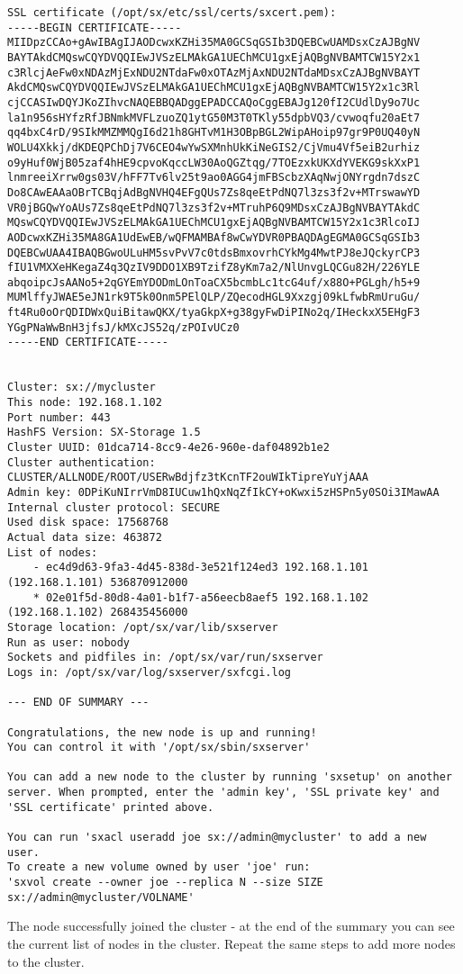 \begin{lstlisting}
SSL certificate (/opt/sx/etc/ssl/certs/sxcert.pem):
-----BEGIN CERTIFICATE-----
MIIDpzCCAo+gAwIBAgIJAODcwxKZHi35MA0GCSqGSIb3DQEBCwUAMDsxCzAJBgNV
BAYTAkdCMQswCQYDVQQIEwJVSzELMAkGA1UEChMCU1gxEjAQBgNVBAMTCW15Y2x1
c3RlcjAeFw0xNDAzMjExNDU2NTdaFw0xOTAzMjAxNDU2NTdaMDsxCzAJBgNVBAYT
AkdCMQswCQYDVQQIEwJVSzELMAkGA1UEChMCU1gxEjAQBgNVBAMTCW15Y2x1c3Rl
cjCCASIwDQYJKoZIhvcNAQEBBQADggEPADCCAQoCggEBAJg120fI2CUdlDy9o7Uc
la1n956sHYfzRfJBNmkMVFLzuoZQ1ytG50M3T0TKly55dpbVQ3/cvwoqfu20aEt7
qq4bxC4rD/9SIkMMZMMQgI6d21h8GHTvM1H3OBpBGL2WipAHoip97gr9P0UQ40yN
WOLU4Xkkj/dKDEQPChDj7V6CEO4wYwSXMnhUkKiNeGIS2/CjVmu4Vf5eiB2urhiz
o9yHuf0WjB05zaf4hHE9cpvoKqccLW30AoQGZtqg/7TOEzxkUKXdYVEKG9skXxP1
lnmreeiXrrw0gs03V/hFF7Tv6lv25t9ao0AGG4jmFBScbzXAqNwjONYrgdn7dszC
Do8CAwEAAaOBrTCBqjAdBgNVHQ4EFgQUs7Zs8qeEtPdNQ7l3zs3f2v+MTrswawYD
VR0jBGQwYoAUs7Zs8qeEtPdNQ7l3zs3f2v+MTruhP6Q9MDsxCzAJBgNVBAYTAkdC
MQswCQYDVQQIEwJVSzELMAkGA1UEChMCU1gxEjAQBgNVBAMTCW15Y2x1c3RlcoIJ
AODcwxKZHi35MA8GA1UdEwEB/wQFMAMBAf8wCwYDVR0PBAQDAgEGMA0GCSqGSIb3
DQEBCwUAA4IBAQBGwoULuHM5svPvV7c0tdsBmxovrhCYkMg4MwtPJ8eJQckyrCP3
fIU1VMXXeHKegaZ4q3QzIV9DDO1XB9TzifZ8yKm7a2/NlUnvgLQCGu82H/226YLE
abqoipcJsAANo5+2qGYEmYDODmLOnToaCX5bcmbLc1tcG4uf/x88O+PGLgh/h5+9
MUMlffyJWAE5eJN1rk9T5k0Onm5PElQLP/ZQecodHGL9Xxzgj09kLfwbRmUruGu/
ft4Ru0oOrQDIDWxQuiBitawQKX/tyaGkpX+g38gyFwDiPINo2q/IHeckxX5EHgF3
YGgPNaWwBnH3jfsJ/kMXcJS52q/zPOIvUCz0
-----END CERTIFICATE-----


Cluster: sx://mycluster
This node: 192.168.1.102
Port number: 443
HashFS Version: SX-Storage 1.5
Cluster UUID: 01dca714-8cc9-4e26-960e-daf04892b1e2
Cluster authentication: CLUSTER/ALLNODE/ROOT/USERwBdjfz3tKcnTF2ouWIkTipreYuYjAAA
Admin key: 0DPiKuNIrrVmD8IUCuw1hQxNqZfIkCY+oKwxi5zHSPn5y0SOi3IMawAA
Internal cluster protocol: SECURE
Used disk space: 17568768
Actual data size: 463872
List of nodes:
    - ec4d9d63-9fa3-4d45-838d-3e521f124ed3 192.168.1.101 (192.168.1.101) 536870912000
    * 02e01f5d-80d8-4a01-b1f7-a56eecb8aef5 192.168.1.102 (192.168.1.102) 268435456000
Storage location: /opt/sx/var/lib/sxserver
Run as user: nobody
Sockets and pidfiles in: /opt/sx/var/run/sxserver
Logs in: /opt/sx/var/log/sxserver/sxfcgi.log

--- END OF SUMMARY ---

Congratulations, the new node is up and running!
You can control it with '/opt/sx/sbin/sxserver'

You can add a new node to the cluster by running 'sxsetup' on another
server. When prompted, enter the 'admin key', 'SSL private key' and
'SSL certificate' printed above.

You can run 'sxacl useradd joe sx://admin@mycluster' to add a new user.
To create a new volume owned by user 'joe' run:
'sxvol create --owner joe --replica N --size SIZE sx://admin@mycluster/VOLNAME'
\end{lstlisting}
\LARGE
The node successfully joined the cluster - at the end of the summary you can
see the current list of nodes in the cluster. Repeat the same steps to add more
nodes to the cluster.

